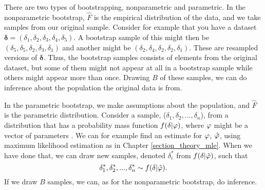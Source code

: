 There are two types of bootstrapping, nonparametric and parametric. In the nonparametric bootstrap, $\hat{F}$ is the empirical distribution of the data, and we take samples from our original sample. Consider for example that you have a dataset $\boldsymbol{\delta}=(\delta_1,\delta_2,\delta_3,\delta_4,\delta_{5})$. A bootstrap sample of this might then be $(\delta_5,\delta_5,\delta_2,\delta_3,\delta_1)$ and another might be $(\delta_2,\delta_{4},\delta_{2},\delta_{2},\delta_{1})$. These are resampled versions of $\boldsymbol{\delta}$. Thus, the bootstrap samples consists of elements from the original dataset, but some of them might not appear at all in a bootstrap sample while others might appear more than once. Drawing $B$ of these samples, we can do inference about the population the original data is from. 

In the parametric bootstrap, we make assumptions about the population, and $\hat{F}$ is the parametric distribution. Consider a sample, ($\delta_1,\delta_2,...,\delta_n$), from a distribution that has a probability mass function $f(\delta|\varphi)$, where $\varphi$ might be a vector of parameters \citep{statinf}. We can for example find an estimate for $\varphi$, $\hat{\varphi}$, using maximum likelihood estimation as in Chapter \ref{section_theory_mle}. When we have done that, we can draw new samples, denoted $\delta_i^*$ from $f(\delta|\hat{\varphi})$, such that
\begin{equation*}
    \delta_1^*,\delta_2^*,...,\delta_n^* \sim f(\delta|\hat{\varphi}).
\end{equation*}
If we draw $B$ samples, we can, as for the nonparametric bootstrap, do inference. 




